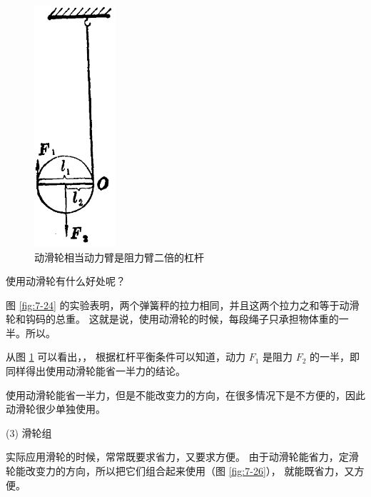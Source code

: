 \begin{figure}[htbp]
\begin{minipage}{5cm}
    \includegraphics[width=3cm]{../pic/czwl1-ch7-25}
    \caption{动滑轮相当动力臂是阻力臂二倍的杠杆}\label{fig:7-25}
    \end{minipage}
\end{figure}

使用动滑轮有什么好处呢？

图 \ref{fig:7-24} 的实验表明，两个弹簧秤的拉力相同，并且这两个拉力之和等于动滑轮和钩码的总重。
这就是说，使用动滑轮的时候，每段绳子只承担物体重的一半。所以。

从图 \ref{fig:7-25} 可以看出，，
根据杠杆平衡条件可以知道，动力 $F_1$ 是阻力 $F_2$ 的一半，即同样得出使用动滑轮能省一半力的结论。

使用动滑轮能省一半力，但是不能改变力的方向，在很多情况下是不方便的，因此动滑轮很少单独使用。

(3) 滑轮组

实际应用滑轮的时候，常常既要求省力，又要求方便。
由于动滑轮能省力，定滑轮能改变力的方向，所以把它们组合起来使用（图 \ref{fig:7-26}），
就能既省力，又方便。



